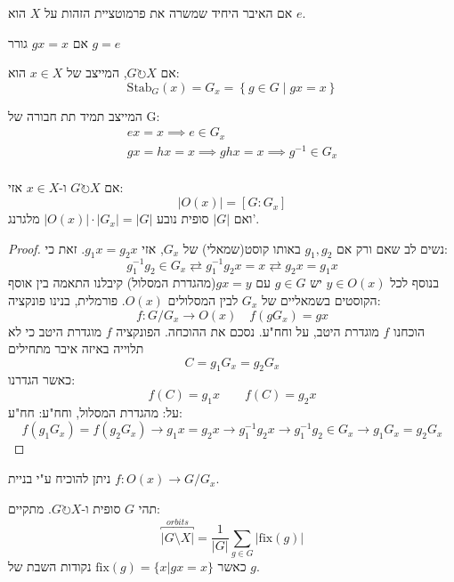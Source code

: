 \documentclass{tstextbook}
\begin{document}
\begin{definition}
אם האיבר היחיד שמשרה את פרמוטציית הזהות על \(X\) הוא \(e\).

\end{definition}
\begin{definition}
אם \(gx=x\) גורר \(g=e\)

\end{definition}
\begin{definition}[מייצב]
אם \(G\circlearrowright X\), המייצב של \(x \in X\) הוא:
$$\text{Stab}_{G}(x)=G_{x}=\left\{  g\in G \;\big|\;gx=x  \right\}$$

\end{definition}
\begin{proposition}
המייצב תמיד תת חבורה של G:
$$\begin{gather}ex=x\implies e\in  G_{x} \\gx=hx=x\implies ghx=x\implies g^{-1} \in  G_{x} \\
\end{gather}$$

\end{proposition}
\begin{theorem}
אם \(G\circlearrowright X\) ו-\(x \in X\) אזי:
$$|O(x)|=[G:G_x]$$
ואם \(|G|\) סופית נובע \(|O(x)|\cdot|G_{x}|=|G|\) מלגרנג'.

\end{theorem}
\begin{proof}
נשים לב שאם ורק אם \(g_{1},g_{2}\) באותו קוסט(שמאלי) של \(G_{x}\), אזי \(g_{1}x=g_{2}x\). זאת כי:
$$g_{1}^{-1} g_{2}\in G_{x}\rightleftarrows g_{1}^{-1} g_{2}x=x \rightleftarrows g_{2}x=g_{1}x$$
בנוסף לכל \(y\in O(x)\) יש \(g \in G\) עם \(gx=y\)(מהגדרת המסלול)
קיבלנו התאמה בין אוסף הקוסטים בשמאליים של \(G_{x}\) לבין המסלולים \(O(x)\).
פורמלית, בנינו פונקציה:
$$f:G/G_{x}\to O(x)\quad f(gG_{x})=gx$$
הוכחנו \(f\) מוגדרת היטב, על וחח"ע.
נסכם את ההוכחה. הפונקציה \(f\) מוגדרת היטב כי לא תלוייה באיזה איבר מתחילים
$$C=g_{1}G_{x}=g_{2}G_{x}$$
כאשר הגדרנו:
$$f(C)=g_{1}x\qquad f(C)=g_{2}x$$
על: מהגדרת המסלול, וחח"ע:
חח"ע:
$$f(g_{1}G_{x})=f(g_{2}G_{x})\to g_{1}x=g_{2}x\to g_{1}^{-1} g_{2}x\to g_{1}^{-1} g_{2}\in G_{x}\to g_{1}G_{x}=g_{2}G_{x}$$

\end{proof}
\begin{remark}
ניתן להוכיח ע"י בניית  \(f:O(x)\to G/G_{x}\).

\end{remark}
\begin{lemma}
תהי \(G\) סופית ו-\(G\circlearrowright X\). מתקיים:
$$\overbracket{ |G\setminus X| }^{ orbits }=\frac{1}{|G|}\sum_{g\in  G}|\mathrm{fix}(g)|$$
כאשר \(\mathrm{fix}(g)=\{ x|gx=x \}\) נקודות השבת של \(g\).

\end{lemma}
\end{document}
